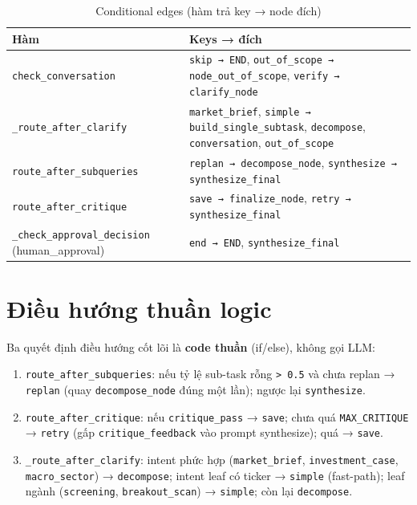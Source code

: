 \documentclass[12pt, a4paper]{report}
\begin{document}
\begin{table}[H]
\centering
\caption{Conditional edges (hàm trả key → node đích)}
\small
\begin{tabularx}{\textwidth}{lX}
\toprule
\textbf{Hàm} & \textbf{Keys → đích} \\
\midrule
\texttt{check\_conversation} & \texttt{skip → END}, \texttt{out\_of\_scope → node\_out\_of\_scope}, \texttt{verify → clarify\_node} \\
\rowcolor{rowgray}
\texttt{\_route\_after\_clarify} & \texttt{market\_brief}, \texttt{simple → build\_single\_subtask}, \texttt{decompose}, \texttt{conversation}, \texttt{out\_of\_scope} \\
\texttt{route\_after\_subqueries} & \texttt{replan → decompose\_node}, \texttt{synthesize → synthesize\_final} \\
\rowcolor{rowgray}
\texttt{route\_after\_critique} & \texttt{save → finalize\_node}, \texttt{retry → synthesize\_final} \\
\texttt{\_check\_approval\_decision} (human\_approval) & \texttt{end → END}, \texttt{synthesize\_final} \\
\bottomrule
\end{tabularx}
\end{table}

\section{Điều hướng thuần logic}

Ba quyết định điều hướng cốt lõi là \textbf{code thuần} (if/else), không gọi LLM:

\begin{enumerate}
  \item \texttt{route\_after\_subqueries}: nếu tỷ lệ sub-task rỗng \texttt{> 0.5} và chưa replan → \texttt{replan} (quay \texttt{decompose\_node} đúng một lần); ngược lại \texttt{synthesize}.
  \item \texttt{route\_after\_critique}: nếu \texttt{critique\_pass} → \texttt{save}; chưa quá \texttt{MAX\_CRITIQUE} → \texttt{retry} (gấp \texttt{critique\_feedback} vào prompt synthesize); quá → \texttt{save}.
  \item \texttt{\_route\_after\_clarify}: intent phức hợp (\texttt{market\_brief}, \texttt{investment\_case}, \texttt{macro\_sector}) → \texttt{decompose}; intent leaf có ticker → \texttt{simple} (fast-path); leaf ngành (\texttt{screening}, \texttt{breakout\_scan}) → \texttt{simple}; còn lại \texttt{decompose}.
\end{enumerate}
\end{document}
